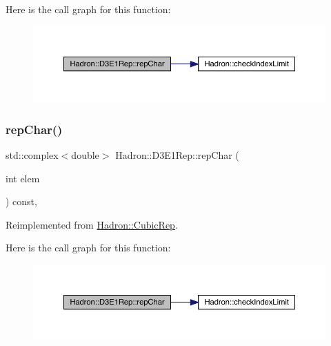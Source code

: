 Here is the call graph for this function\+:
\nopagebreak
\begin{figure}[H]
\begin{center}
\leavevmode
\includegraphics[width=350pt]{d3/daf/structHadron_1_1D3E1Rep_a67caadd543a2e693c1be006d8e11742c_cgraph}
\end{center}
\end{figure}
\mbox{\label{structHadron_1_1D3E1Rep_a67caadd543a2e693c1be006d8e11742c}} 
\subsubsection{\texorpdfstring{repChar()}{repChar()}\hspace{0.1cm}{\footnotesize\ttfamily [2/2]}}
{\footnotesize\ttfamily std\+::complex$<$double$>$ Hadron\+::\+D3\+E1\+Rep\+::rep\+Char (\begin{DoxyParamCaption}\item[{int}]{elem }\end{DoxyParamCaption}) const\hspace{0.3cm}{\ttfamily [inline]}, {\ttfamily [virtual]}}



Reimplemented from \mbox{\hyperlink{structHadron_1_1CubicRep_af45227106e8e715e84b0af69cd3b36f8}{Hadron\+::\+Cubic\+Rep}}.

Here is the call graph for this function\+:
\nopagebreak
\begin{figure}[H]
\begin{center}
\leavevmode
\includegraphics[width=350pt]{d3/daf/structHadron_1_1D3E1Rep_a67caadd543a2e693c1be006d8e11742c_cgraph}
\end{center}
\end{figure}
\mbox{\label{structHadron_1_1D3E1Rep_ac66aebdefbd99d129891c85cbc86b430}} 
